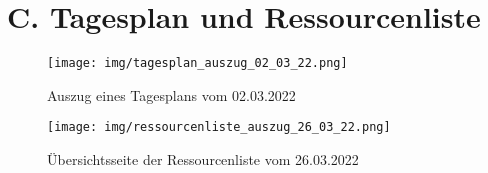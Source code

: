\section*{C. Tagesplan und Ressourcenliste}
\begin{figure}[H]
    \texttt{[image: img/tagesplan\_auszug\_02\_03\_22.png]}
    \caption{Auszug eines Tagesplans vom 02.03.2022}\label{fig:tagesplan}
\end{figure}

\begin{figure}[H]
    \texttt{[image: img/ressourcenliste\_auszug\_26\_03\_22.png]}
    \caption{Übersichtsseite der Ressourcenliste vom 26.03.2022}\label{fig:ressourcenliste}
\end{figure}